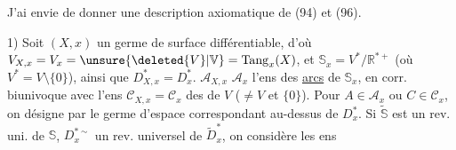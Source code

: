 J'ai envie de donner une description axiomatique de (94) et (96).

1) Soit  $(X,x)$ un germe de surface différentiable, d'où
$V_{X,x}=V_x=\unsure{\deleted{V}|\mathbb V}=\operatorname{Tang}_x(X)$,
et $\mathbb S_x=V^*/\mathbb R^{*+}$ (où $V^*=V\setminus\{0\}$), ainsi que $D_{X,x}^*=D_x^*$.
$\mathcal A_{X,x}$  $\mathcal A_x$ l'ens des \uline{arcs} de $\mathbb S_x$, en corr. biunivoque avec l'ens $\mathcal C_{X,x}=\mathcal C_x$ des
 de $V$ ($\ne V$ et $\{0\}$).
Pour $A\in\mathcal A_x$ ou $C\in\mathcal C_x$, on désigne par
le germe d'espace correspondant au-dessus de $D_x^*$.
Si $\widetilde{\mathbb S}$ est un rev. uni. de $\mathbb S$, $D_x^{*\sim}$ un rev. universel de $\widetilde D_x^*$, on considère les ens

